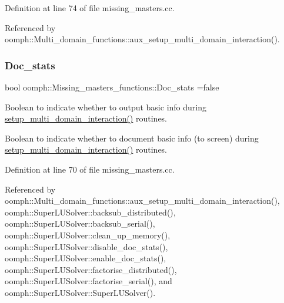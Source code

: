Definition at line 74 of file missing\+\_\+masters.\+cc.



Referenced by oomph\+::\+Multi\+\_\+domain\+\_\+functions\+::aux\+\_\+setup\+\_\+multi\+\_\+domain\+\_\+interaction().

\mbox{\label{namespaceoomph_1_1Missing__masters__functions_a86ac04bf0028ba6e66c07466cc9774ce}} 
\subsubsection{\texorpdfstring{Doc\+\_\+stats}{Doc\_stats}}
{\footnotesize\ttfamily bool oomph\+::\+Missing\+\_\+masters\+\_\+functions\+::\+Doc\+\_\+stats =false}



Boolean to indicate whether to output basic info during \hyperlink{namespaceoomph_1_1Multi__domain__functions_ac64183e03f173c69ed6ed6f493a1a67e}{setup\+\_\+multi\+\_\+domain\+\_\+interaction()} routines. 

Boolean to indicate whether to document basic info (to screen) during \hyperlink{namespaceoomph_1_1Multi__domain__functions_ac64183e03f173c69ed6ed6f493a1a67e}{setup\+\_\+multi\+\_\+domain\+\_\+interaction()} routines. 

Definition at line 70 of file missing\+\_\+masters.\+cc.



Referenced by oomph\+::\+Multi\+\_\+domain\+\_\+functions\+::aux\+\_\+setup\+\_\+multi\+\_\+domain\+\_\+interaction(), oomph\+::\+Super\+L\+U\+Solver\+::backsub\+\_\+distributed(), oomph\+::\+Super\+L\+U\+Solver\+::backsub\+\_\+serial(), oomph\+::\+Super\+L\+U\+Solver\+::clean\+\_\+up\+\_\+memory(), oomph\+::\+Super\+L\+U\+Solver\+::disable\+\_\+doc\+\_\+stats(), oomph\+::\+Super\+L\+U\+Solver\+::enable\+\_\+doc\+\_\+stats(), oomph\+::\+Super\+L\+U\+Solver\+::factorise\+\_\+distributed(), oomph\+::\+Super\+L\+U\+Solver\+::factorise\+\_\+serial(), and oomph\+::\+Super\+L\+U\+Solver\+::\+Super\+L\+U\+Solver().

\mbox{\label{namespaceoomph_1_1Missing__masters__functions_acd9cae489a6217b1566a1e40cbca86cf}} 
